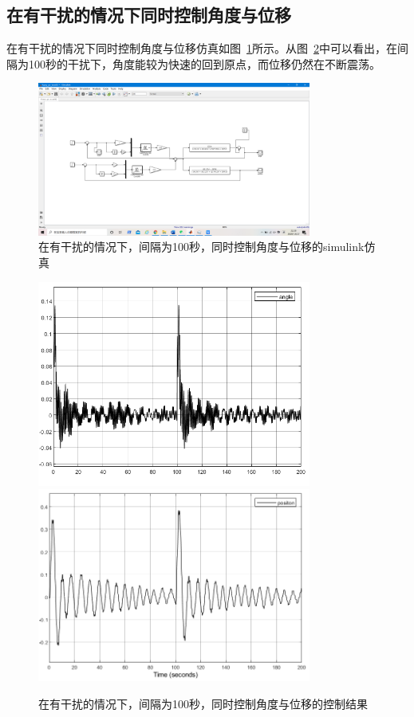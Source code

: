 \subsection{在有干扰的情况下同时控制角度与位移}
在有干扰的情况下同时控制角度与位移仿真如图~\ref{fig:youganrao1001}所示。从图~\ref{fig:youganrao1002}中可以看出，在间隔为100秒的干扰下，角度能较为快速的回到原点，而位移仍然在不断震荡。

\begin{figure}[hbpt]
\centering
\includegraphics[width=9cm]{youganrao1001.png}

\caption{在有干扰的情况下，间隔为100秒，同时控制角度与位移的simulink仿真}\label{fig:youganrao1001}
\end{figure}

\begin{figure}[hbpt]
\centering
\includegraphics[width=9cm]{youganrao1002.png}
\includegraphics[width=9cm]{youganrao1003.png}
\caption{在有干扰的情况下，间隔为100秒，同时控制角度与位移的控制结果}\label{fig:youganrao1002}
\end{figure}


